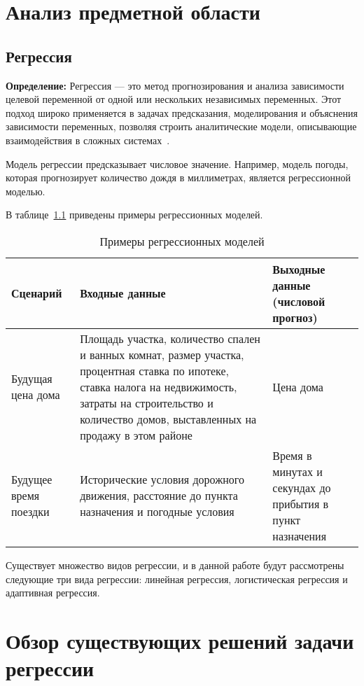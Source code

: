 \chapter{Анализ предметной области}

\section{Регрессия}

\textbf{Определение:} Регрессия — это метод прогнозирования и анализа зависимости целевой переменной от одной или нескольких независимых переменных.
Этот подход широко применяется в задачах предсказания, моделирования и объяснения зависимости переменных, позволяя строить аналитические модели, описывающие взаимодействия в сложных системах~\cite{seber, montgomery}.

Модель регрессии предсказывает числовое значение.
Например, модель погоды, которая прогнозирует количество дождя в миллиметрах, является регрессионной моделью.

В таблице~\ref{tab:tabl1} приведены примеры регрессионных моделей.

\begin{table}[ht]
    \centering
    \caption{Примеры регрессионных моделей}
    \begin{tabularx}{\textwidth}{|>{\centering\arraybackslash}X|>{\centering\arraybackslash}X|>{\centering\arraybackslash}X|}
        \hline
        Сценарий & Входные данные & Выходные данные \newline(числовой прогноз) \\
        \hline
        Будущая цена дома & Площадь участка, количество спален и ванных комнат, размер участка, процентная ставка по ипотеке, ставка налога на недвижимость, затраты на строительство и количество домов, выставленных на продажу в этом районе & Цена дома \\
        \hline
        Будущее время поездки & Исторические условия дорожного движения, расстояние до пункта назначения и погодные условия & Время в минутах и секундах до прибытия в пункт назначения \\
        \hline
    \end{tabularx}
    \label{tab:tabl1}
\end{table}

Существует множество видов регрессии, и в данной работе будут рассмотрены следующие три вида регрессии: линейная регрессия, логистическая регрессия и адаптивная регрессия.

\chapter{Обзор существующих решений задачи регрессии}
